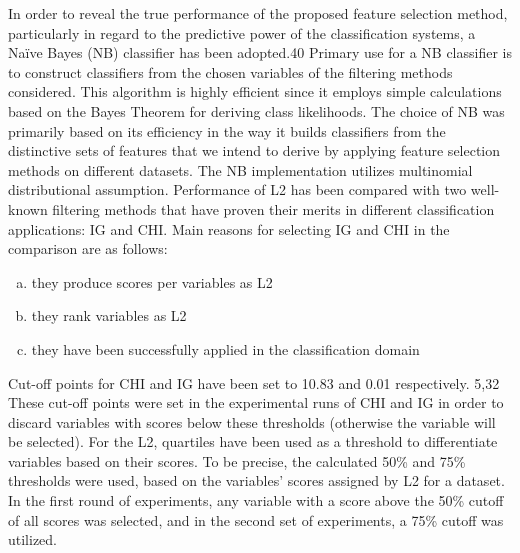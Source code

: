 \documentclass[review]{elsarticle}
\begin{document}
In order to reveal the true performance of the proposed feature selection method, particularly in regard to the predictive power of the classification systems, a Naïve Bayes (NB) classifier has been adopted.40 Primary use for a NB classifier is to construct classifiers from the chosen variables of the filtering methods considered. This algorithm is highly efficient since it employs simple calculations based on the Bayes Theorem for deriving class likelihoods. The choice of NB was primarily based on its efficiency in the way it builds classifiers from the distinctive sets of features that we intend to derive by applying feature selection methods on different datasets. The NB implementation utilizes multinomial distributional assumption. Performance of L2 has been compared with two well-known filtering methods that have proven their merits in different classification applications: IG and CHI. Main reasons for selecting IG and CHI in the comparison are as follows:

\begin{enumerate}[(a)]
	\item they produce scores per variables as L2
	\item they rank variables as L2
	\item they have been successfully applied in the classification domain
	
\end{enumerate}

Cut-off points for CHI and IG have been set to 10.83 and 0.01 respectively. 5,32  These cut-off points were set in the experimental runs of CHI and IG in order to discard variables with scores below these thresholds (otherwise the variable will be selected). For the L2, quartiles have been used as a threshold to differentiate variables based on their scores. To be precise, the calculated 50\% and 75\% thresholds were used, based on the variables’ scores assigned by L2 for a dataset. In the first round of experiments, any variable with a score above the 50\% cutoff of all scores was selected, and in the second set of experiments, a 75\% cutoff was utilized.  
\end{document}

